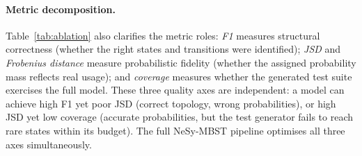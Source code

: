 \paragraph{Metric decomposition.}
Table~\ref{tab:ablation} also clarifies the metric roles:
\emph{F1} measures structural correctness (whether the right states and
transitions were identified); \emph{JSD} and \emph{Frobenius distance}
measure probabilistic fidelity (whether the assigned probability mass
reflects real usage); and \emph{coverage} measures whether the generated
test suite exercises the full model.  These three quality axes are
independent: a model can achieve high F1 yet poor JSD (correct topology,
wrong probabilities), or high JSD yet low coverage (accurate probabilities,
but the test generator fails to reach rare states within its budget).
The full NeSy-MBST pipeline optimises all three axes simultaneously.
